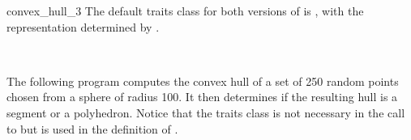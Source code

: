 \begin{ccRefFunction}{convex_hull_3}
The default traits class for both versions of  is 
,%
with the representation determined by .

\ccSeeAlso

  \\

\ccExample

The following program computes the convex hull of a set of 250 random
points chosen from a sphere of radius 100.  It then determines if the resulting
hull is a segment or a polyhedron.  Notice that the traits class is not
necessary in the call to  but is used in the definition
of .


\end{ccRefFunction}
